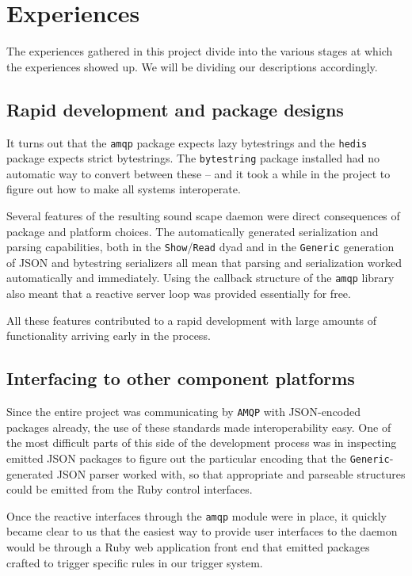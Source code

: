 \section{Experiences}
\label{sec:experiences}

The experiences gathered in this project divide into the various
stages at which the experiences showed up. We will be dividing our
descriptions accordingly.

\subsection{Rapid development and package designs}
\label{sec:rapid-devel-pack}

It turns out that the \texttt{amqp} package expects lazy bytestrings
and the \texttt{hedis} package expects strict bytestrings. The
\texttt{bytestring} package installed had no automatic way to convert
between these -- and it took a while in the project to figure out how
to make all systems interoperate.

Several features of the resulting sound scape daemon were
direct consequences of package and platform choices. The automatically
generated serialization and parsing capabilities, both in the
\texttt{Show}/\texttt{Read} dyad and in the \texttt{Generic}
generation of JSON and bytestring serializers all mean that parsing
and serialization worked automatically and immediately. Using the
callback structure of the \texttt{amqp} library also meant that a
reactive server loop was provided essentially for free.

All these features contributed to a rapid development with large
amounts of functionality arriving early in the process.

\subsection{Interfacing to other component platforms}
\label{sec:interf-other-comp}

Since the entire project was communicating by \texttt{AMQP} with JSON-encoded
packages already, the use of these standards made interoperability
easy. One of the most difficult parts of this side of the development
process was in inspecting emitted JSON packages to figure out the
particular encoding that the \texttt{Generic}-generated JSON parser
worked with, so that appropriate and parseable structures could be
emitted from the Ruby control interfaces.

Once the reactive interfaces through the \texttt{amqp} module were in
place, it quickly became clear to us that the easiest way to provide user
interfaces to the daemon would be through a Ruby web application
front end that emitted packages crafted to trigger specific rules in
our trigger system. 

